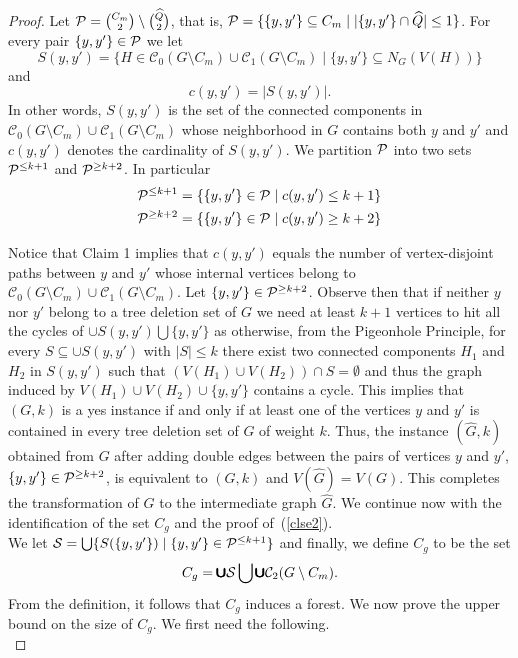 \documentclass[a4paper,11pt]{article}
\newcommand{\cc}{{\mathcal{C}}}
\newcommand{\cupall}{\pmb{\pmb{\cup}}}
\begin{document}
\begin{proof}
\noindent Let ${\cal P}=\binom{C_{m}}{2}\setminus \binom{\widehat{Q}}{2}$, that is, 
${\cal P}=\{\{y,y'\}\subseteq C_{m} \mid |\{y,y'\}\cap \widehat{Q}|\leq 1\}$. For every pair $\{y,y'\}\in {\cal P}$ we let 
\begin{equation}
S(y,y') = \{H\in \cc_{0}(G\setminus C_{m})\cup \cc_{1}(G\setminus C_{m})\mid \{y,y'\}\subseteq N_{G}(V(H)) \}
\end{equation}
and
\begin{equation}
c(y,y') = |S(y,y')|.
\end{equation}
In other words, $S(y,y')$ is the set of the connected components in $\cc_{0}(G\setminus C_{m})\cup \cc_{1}(G\setminus C_{m})$ 
whose neighborhood in $G$ contains both $y$ and $y'$ and $c(y,y')$ denotes the cardinality of $S(y,y')$. We partition ${\cal P}$ into 
two sets ${\cal P}^{\leq k+1}$ and ${\cal P}^{\geq k+2}$. In particular
\begin{eqnarray}
{\cal P}^{\leq k+1} = \{\{y,y'\}\in {\cal P}\mid c(y,y')\leq k+1\}\\
{\cal P}^{\geq k+2} = \{\{y,y'\}\in {\cal P}\mid c(y,y')\geq k+2\}
\end{eqnarray}

\noindent Notice that Claim 1 implies that $c(y,y')$ equals the number of vertex-disjoint 
paths between $y$ and $y'$ whose internal vertices belong to  $\cc_{0}(G\setminus C_{m})\cup \cc_{1}(G\setminus C_{m})$.
Let $\{y,y'\}\in {\cal P}^{\geq k+2}$. 
Observe then that if neither $y$ nor $y'$ belong to a tree deletion set of $G$ we need at least $k+1$ vertices to hit all the cycles 
of $\cupall S(y,y') \bigcup \{y,y'\}$ as otherwise, from the Pigeonhole Principle, for every $S\subseteq \cupall S(y,y')$ with $|S|\leq k$ 
there exist two connected components $H_{1}$ and $H_{2}$ in $S(y,y')$ 
such that $(V(H_{1})\cup V(H_{2}))\cap S=\emptyset$ and thus the graph induced by $V(H_{1})\cup V(H_{2})\cup \{y,y'\}$ contains a cycle.
This implies that $(G,k)$ is a yes instance if and only if at least one of the vertices $y$ and $y'$ is contained
in every tree deletion set of $G$ of weight $k$. Thus, the instance $(\widehat{G},k)$ obtained from $G$ after adding
double edges between the pairs of vertices $y$ and $y'$, $\{y,y'\}\in {\cal P}^{\geq k+2}$, is equivalent to $(G,k)$ and $V(\widehat{G})=V(G)$.
This completes the transformation of $G$ to the intermediate graph $\widehat{G}$. We continue now with the identification of the set $C_{g}$
and the proof of~(\ref{clse2}).\\

\noindent We let ${\cal S}=\bigcup\{S(\{y,y'\})\mid \{y,y'\}\in {\cal P}^{\leq k+1}\}$ and finally, we define $C_{g}$ to be the set 
\begin{equation}\label{grbgdfn}
C_{g} = \cupall {\cal S}\bigcup  \cupall \cc_{2}(G\setminus C_{m}).
\end{equation}
\noindent From the definition, it follows that $C_{g}$ induces a forest. We now prove the upper bound on the size of $C_{g}$. We first need the following.\\


\end{proof}
\end{document}
